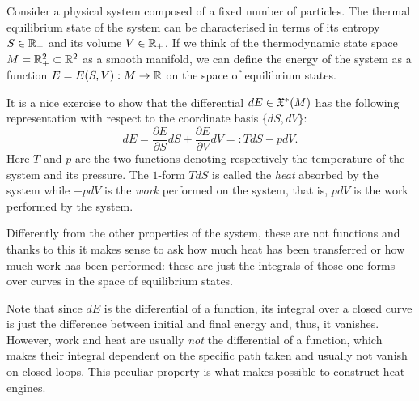 \begin{example}
	Consider a physical system composed of a fixed number of particles.
	The thermal equilibrium state of the system can be characterised in terms of its entropy $S\in\mathbb{R}_+$ and its volume $V\in\mathbb{R}_+$.
	If we think of the thermodynamic state space $M=\mathbb{R}_+^2 \subset \mathbb{R}^2$ as a smooth manifold, we can define the energy of the system as a function $E = E(S,V): M \to\mathbb{R}$ on the space of equilibrium states.

	It is a nice exercise to show that the differential $dE\in\mathfrak{X}^*(M)$ has the following representation with respect to the coordinate basis $\{dS,dV\}$:
	\begin{equation}
		dE = \frac{\partial E}{\partial S}dS + \frac{\partial E}{\partial V} dV =: T dS - p dV.
	\end{equation}
	Here $T$ and $p$ are the two functions denoting respectively the temperature of the system and its pressure.
	The $1$-form $TdS$ is called the \emph{heat} absorbed by the system while $-p dV$ is the \emph{work} performed on the system, that is, $p dV$ is the work performed by the system.

	Differently from the other properties of the system, these are not functions and thanks to this it makes sense to ask how much heat has been transferred or how much work has been performed: these are just the integrals of those one-forms over curves in the space of equilibrium states.

	Note that since $dE$ is the differential of a function, its integral over a closed curve is just the difference between initial and final energy and, thus, it vanishes.
	However, work and heat are usually \emph{not} the differential of a function, which makes their integral dependent on the specific path taken and usually not vanish on closed loops.
	This peculiar property is what makes possible to construct heat engines.
\end{example}
